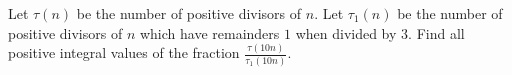 Let 
$\tau(n)$
 be the number of positive divisors of 
$n$. 
 Let 
$\tau_1(n)$
 be the number of positive divisors of 
$n$
 which have remainders 
$1$
 when divided by 
$3$. 
 Find all positive integral values of the fraction 
$\frac{\tau(10n)}{\tau_1(10n)}$. 
